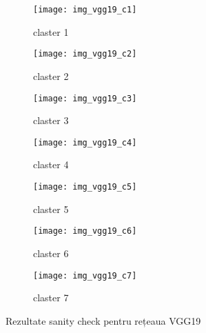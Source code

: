 \begin{figure}[!tbp]
  \centering
  \begin{subfigure}[b]{0.50\textwidth}
    \texttt{[image: img\_vgg19\_c1]}
    \caption{claster 1}
  \end{subfigure}
  \hfill
  \begin{subfigure}[b]{0.50\textwidth}
    \texttt{[image: img\_vgg19\_c2]}
    \caption{claster 2}
  \end{subfigure}
   \hfill
  \begin{subfigure}[b]{0.50\textwidth}
    \texttt{[image: img\_vgg19\_c3]}
    \caption{claster 3}
  \end{subfigure}
  \hfill
  \begin{subfigure}[b]{0.50\textwidth}
    \texttt{[image: img\_vgg19\_c4]}
    \caption{claster 4}
  \end{subfigure}
  \hfill
  \begin{subfigure}[b]{0.50\textwidth}
    \texttt{[image: img\_vgg19\_c5]}
    \caption{claster 5}
  \end{subfigure}
  \hfill
  \begin{subfigure}[b]{0.50\textwidth}
    \texttt{[image: img\_vgg19\_c6]}
    \caption{claster 6}
  \end{subfigure}
    \hfill
  \begin{subfigure}[b]{0.50\textwidth}
    \texttt{[image: img\_vgg19\_c7]}
    \caption{claster 7}
  \end{subfigure}
  \caption[Rezultate sanity check pentru rețeaua VGG19]{Rezultate sanity check pentru rețeaua VGG19}
\end{figure}

